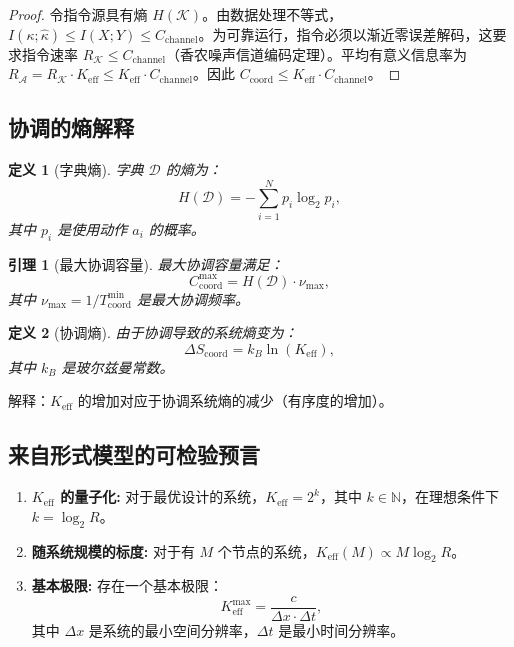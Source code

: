 \documentclass[12pt]{article}
\newtheorem{definition}{定义}
\newtheorem{lemma}{引理}
\begin{document}
	\begin{proof}
		令指令源具有熵 \(H(\mathcal{K})\)。由数据处理不等式，\(I(\kappa;\hat{\kappa}) \le I(X;Y) \le C_{\mathrm{channel}}\)。为可靠运行，指令必须以渐近零误差解码，这要求指令速率 \(R_{\mathcal{K}} \le C_{\mathrm{channel}}\)（香农噪声信道编码定理）。平均有意义信息率为 \(R_{\mathcal{A}} = R_{\mathcal{K}} \cdot K_{\mathrm{eff}} \le K_{\mathrm{eff}} \cdot C_{\mathrm{channel}}\)。因此 \(C_{\mathrm{coord}} \le K_{\mathrm{eff}} \cdot C_{\mathrm{channel}}\)。
	\end{proof}
	
	\subsection{协调的熵解释}
	\label{app:entropy}
	
	\begin{definition}[字典熵]
		字典 $\mathcal{D}$ 的熵为：
		\[
		H(\mathcal{D}) = - \sum_{i=1}^{N} p_i \log_2 p_i,
		\]
		其中 $p_i$ 是使用动作 $a_i$ 的概率。
	\end{definition}
	
	\begin{lemma}[最大协调容量]
		最大协调容量满足：
		\[
		C_{\text{coord}}^{\text{max}} = H(\mathcal{D}) \cdot \nu_{\text{max}},
		\]
		其中 $\nu_{\text{max}} = 1 / T_{\text{coord}}^{\text{min}}$ 是最大协调频率。
	\end{lemma}
	
	\begin{definition}[协调熵]
		由于协调导致的系统熵变为：
		\[
		\Delta S_{\text{coord}} = k_B \ln(K_{\mathrm{eff}}),
		\]
		其中 $k_B$ 是玻尔兹曼常数。
	\end{definition}
	
	解释：$K_{\mathrm{eff}}$ 的增加对应于协调系统熵的减少（有序度的增加）。
	
	\subsection{来自形式模型的可检验预言}
	\label{app:predictions}
	
	\begin{enumerate}
		\item \textbf{$K_{\mathrm{eff}}$ 的量子化:} 对于最优设计的系统，$K_{\mathrm{eff}} = 2^k$，其中 $k \in \mathbb{N}$，在理想条件下 $k = \log_2 R$。
		
		\item \textbf{随系统规模的标度:} 对于有 $M$ 个节点的系统，$K_{\mathrm{eff}}(M) \propto M \log_2 R$。
		
		\item \textbf{基本极限:} 存在一个基本极限：
		\[
		K_{\mathrm{eff}}^{\text{max}} = \frac{c}{\Delta x \cdot \Delta t},
		\]
		其中 $\Delta x$ 是系统的最小空间分辨率，$\Delta t$ 是最小时间分辨率。
	\end{enumerate}
	
\end{document}
